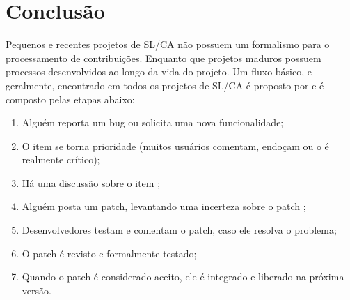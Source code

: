 % 
% 
% 
% 

\section{Conclusão} \label{sec:conclusao}

Pequenos e recentes projetos de SL/CA não possuem um formalismo para o processamento de contribuições. Enquanto que projetos maduros possuem processos desenvolvidos ao longo da vida do projeto. Um fluxo básico, e geralmente, encontrado em todos os projetos de SL/CA é proposto por \cite{preliminary} e é composto pelas etapas abaixo:

\begin{enumerate}
 \item Alguém reporta um bug ou solicita uma nova funcionalidade;
 \item O item se torna prioridade (muitos usuários comentam, endoçam ou o é realmente crítico);
 \item Há uma discussão sobre o item \label{enu:discussao};
 \item Alguém posta um patch, levantando uma incerteza sobre o patch \label{enu:postapatch};
 \item Desenvolvedores testam e comentam o patch, caso ele resolva o problema;
 \item O patch é revisto e formalmente testado;
 \item Quando o patch é considerado aceito, ele é integrado e liberado na próxima versão.
\end{enumerate}


